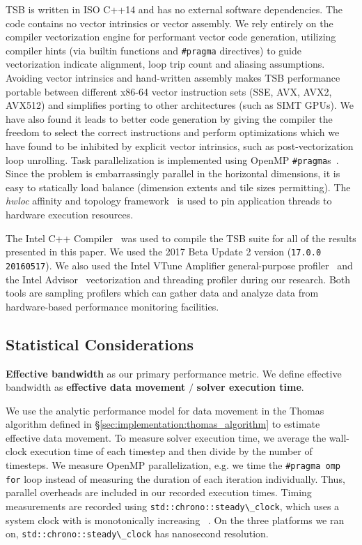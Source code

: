 \documentclass{sig-alternate-05-2015}
\begin{document}
TSB is written in ISO C++14 and has no external software dependencies.
The code contains no vector intrinsics or vector assembly.
We rely entirely on the compiler vectorization engine for performant vector code
  generation, utilizing compiler hints (via builtin functions and
  \lstinline{#pragma} directives) to guide vectorization indicate alignment, loop
  trip count and aliasing assumptions.
Avoiding vector intrinsics and hand-written assembly makes TSB performance
  portable between different x86-64 vector instruction sets (SSE, AVX, AVX2,
  AVX512) and simplifies porting to other architectures (such as SIMT GPUs).
We have also found it leads to better code generation by giving the compiler
  the freedom to select the correct instructions and perform optimizations which
  we have found to be inhibited by explicit vector intrinsics, such as
  post-vectorization loop unrolling.
Task parallelization is implemented using OpenMP
  \lstinline{#pragma}s~\cite{openmp}.
Since the problem is embarrassingly parallel in the horizontal dimensions, it
  is easy to statically load balance (dimension extents and tile sizes
  permitting).
The \emph{hwloc} affinity and topology framework~\cite{hwloc} is used to pin
  application threads to hardware execution resources.

The Intel C++ Compiler~\cite{intel_cpp_compiler} was used to compile the TSB
  suite for all of the results presented in this paper.
We used the 2017 Beta Update 2 version (\lstinline{17.0.0 20160517}).
We also used the Intel VTune Amplifier general-purpose
  profiler~\cite{intel_vtune_amplifier} and the Intel
  Advisor~\cite{intel_advisor} vectorization and threading profiler during our
  research.
Both tools are sampling profilers which can gather data and analyze data from
  hardware-based performance monitoring facilities.

\subsection{Statistical Considerations}
\label{sec:experimental_setup:stats}

\textbf{Effective bandwidth} as our primary performance metric.
We define effective bandwidth as \textbf{effective data movement} \(/\)
  \textbf{solver execution time}.

We use the analytic performance model for data movement in the Thomas algorithm
  defined in \S\ref{sec:implementation:thomas_algorithm} to estimate effective
  data movement.
To measure solver execution time, we average the wall-clock execution time of
  each timestep and then divide by the number of timesteps.
We measure OpenMP parallelization, e.g. we time the \lstinline{#pragma omp for}
  loop instead of measuring the duration of each iteration individually.
Thus, parallel overheads are included in our recorded execution times.
Timing measurements are recorded using \lstinline{std::chrono::steady\_clock},
  which uses a system clock with is monotonically
  increasing~\cite{cpp14_standard_chrono_steady_clock}
  .
On the three platforms we ran on, \lstinline{std::chrono::steady\_clock} has
  nanosecond resolution.
\end{document}
